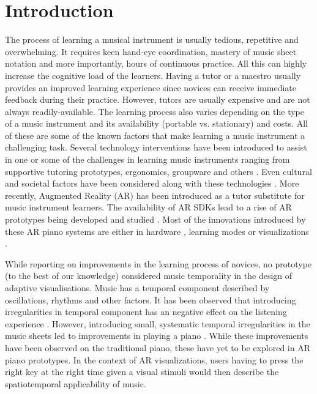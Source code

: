 \documentclass[manuscript,screen]{acmart}
\begin{document}
\section{Introduction}
The process of learning a musical instrument is usually tedious, repetitive and overwhelming. It requires keen hand-eye coordination, mastery of music sheet notation and more importantly, hours of continuous practice. All this can highly increase the cognitive load of the learners. Having a tutor or a maestro usually provides an improved learning experience since novices can receive immediate feedback during their practice. However, tutors are usually expensive and are not always readily-available. The learning process also varies depending on the type of a music instrument and its availability (portable vs. stationary) and costs. All of these are some of the known factors that make learning a music instrument a challenging task.
Several technology interventions have been introduced to assist in one or some of the challenges in learning music instruments ranging from supportive tutoring prototypes, ergonomics, groupware and others \cite{fober2007vemus, daniel2006exploring}. Even cultural and societal factors have been considered along with these technologies \cite{creech2010learning, cope1997cultural}. More recently, Augmented Reality (AR) has been introduced as a tutor substitute for music instrument learners. The availability of AR SDKs lead to a rise of AR prototypes being developed and studied \cite{santos2013augmented}. Most of the innovations introduced by these AR piano systems are either in hardware \cite{barakonyi2005augmented, huang2011piano}, learning modes \cite{rogers2014piano} or visualizations \cite{chow2013music}. 

While reporting on improvements in the learning process of novices, no prototype (to the best of our knowledge) considered music temporality in the design of adaptive visualisations. Music has a temporal component described by oscillations, rhythms and other factors. It has been observed that introducing irregularities in temporal component has an negative effect on the listening experience \cite{lippman1984progressive}. However, introducing  small, systematic temporal irregularities in the music sheets led to improvements in playing a piano \cite{large2002perceiving}. While these improvements have been observed on the traditional piano, these have yet to be explored in AR piano prototypes. In the context of AR visualizations, users having to press the right key at the right time given a visual stimuli would then describe the spatiotemporal applicability of music.
\end{document}
